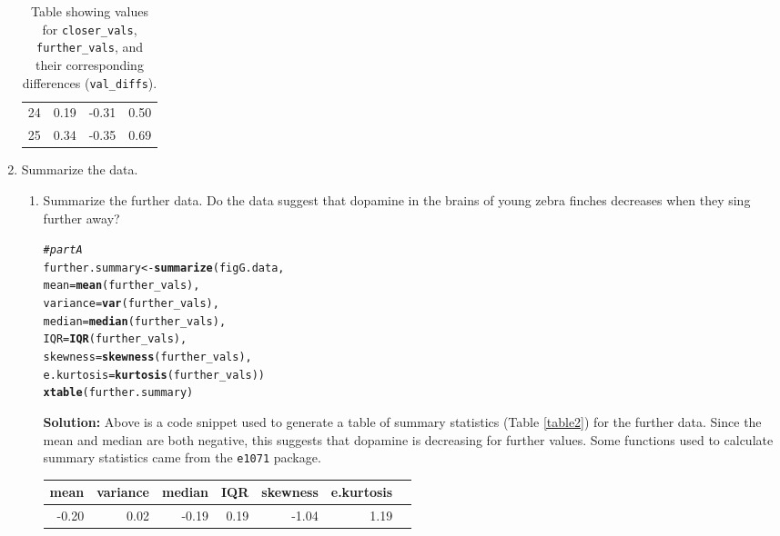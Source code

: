 \documentclass{article}\usepackage[]{graphicx}\usepackage[]{xcolor}
\makeatletter
\newcommand{\hlcom}[1]{\textcolor[rgb]{0.678,0.584,0.686}{\textit{#1}}}%
\newcommand{\hldef}[1]{\textcolor[rgb]{0.345,0.345,0.345}{#1}}%
\newcommand{\hlkwb}[1]{\textcolor[rgb]{0.69,0.353,0.396}{#1}}%
\newcommand{\hlkwc}[1]{\textcolor[rgb]{0.333,0.667,0.333}{#1}}%
\newcommand{\hlkwd}[1]{\textcolor[rgb]{0.737,0.353,0.396}{\textbf{#1}}}%
\newenvironment{kframe}{%
 \def\at@end@of@kframe{}%
 \ifinner\ifhmode%
  \def\at@end@of@kframe{\end{minipage}}%
  \begin{minipage}{\columnwidth}%
 \fi\fi%
 \def\FrameCommand##1{\hskip\@totalleftmargin \hskip-\fboxsep
 \colorbox{shadecolor}{##1}\hskip-\fboxsep
     \hskip-\linewidth \hskip-\@totalleftmargin \hskip\columnwidth}%
 \MakeFramed {\advance\hsize-\width
   \@totalleftmargin\z@ \linewidth\hsize
   \@setminipage}}%
 {\par\unskip\endMakeFramed%
 \at@end@of@kframe}
\newenvironment{knitrout}{}{} %
\makeatother
\begin{document}
\begin{enumerate}
\begin{table}[ht]
\begin{tabular}{rrrr}
  24 & 0.19 & -0.31 & 0.50 \\ 
  25 & 0.34 & -0.35 & 0.69 \\ 
   \hline
\end{tabular}
\caption{Table showing values for \texttt{closer\_vals}, \texttt{further\_vals}, and their corresponding differences (\texttt{val\_diffs}).}
\label{table1}
\end{table}
\newpage
\item Summarize the data.
\begin{enumerate}
  \item Summarize the further data. Do the data suggest that
   dopamine in the brains of young zebra finches decreases when
   they sing further away?
\begin{knitrout}
\color{fgcolor}\begin{kframe}
\begin{alltt}
\hlcom{# part A}
\hldef{further.summary} \hlkwb{<-} \hlkwd{summarize}\hldef{(figG.data,}
                         \hlkwc{mean} \hldef{=} \hlkwd{mean}\hldef{(further_vals),}
                         \hlkwc{variance} \hldef{=} \hlkwd{var}\hldef{(further_vals),}
                         \hlkwc{median} \hldef{=} \hlkwd{median}\hldef{(further_vals),}
                         \hlkwc{IQR} \hldef{=} \hlkwd{IQR}\hldef{(further_vals),}
                         \hlkwc{skewness} \hldef{=} \hlkwd{skewness}\hldef{(further_vals),}
                         \hlkwc{e.kurtosis} \hldef{=} \hlkwd{kurtosis}\hldef{(further_vals))}
\hlkwd{xtable}\hldef{(further.summary)}
\end{alltt}
\end{kframe}
\end{knitrout}
\textbf{Solution:} Above is a code snippet used to generate a table of summary statistics (Table \ref{table2}) for the further data. Since the mean and median are both negative, this suggests that dopamine is decreasing for further values. Some functions used to calculate summary statistics came from the \texttt{e1071} \citep{e1071} package.
\begin{table}[ht]
\centering
\begin{tabular}{rrrrrrr}
  \hline
 mean & variance & median & IQR & skewness & e.kurtosis \\ 
  \hline
-0.20 & 0.02 & -0.19 & 0.19 & -1.04 & 1.19 \\ 

\end{tabular}
\end{table}
\end{enumerate}
\end{enumerate}
\end{document}

